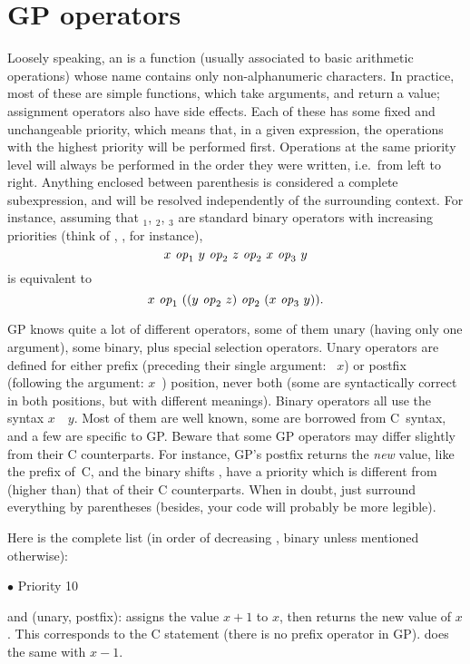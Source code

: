 \section{GP operators}\label{se:operators}

\noindent
Loosely speaking, an  is a function (usually associated to
basic arithmetic operations) whose name contains only non-alphanumeric
characters. In practice, most of these are simple functions, which take
arguments, and return a value; assignment operators also have side effects.
Each of these has some fixed and unchangeable priority, which means that,
in a given expression, the operations with the highest priority will be
performed first. Operations at the same priority level will always be
performed in the order they were written, i.e.~from left to right. Anything
enclosed between parenthesis is considered a complete subexpression, and
will be resolved independently of the surrounding context. For instance,
assuming that $_1$, $_2$, $_3$ are standard binary
operators with increasing priorities (think of \kbd{+}, \kbd{*}, \kbd{\pow}
for instance),
$$ x~\hbox{\it op\/}_1~y~\hbox{\it op\/}_2~z~\hbox{\it op\/}_2~x~\hbox{\it op\/}_3~y $$
is equivalent to
$$ x~\hbox{\it op\/}_1~((y~\hbox{\it op\/}_2~z)~\hbox{\it op\/}_2~ (x~\hbox{\it op\/}_3~y)).$$

GP knows quite a lot of different operators, some of them unary (having
only one argument), some binary, plus special selection operators. Unary
 operators are defined for either
prefix (preceding their single argument: ~$x$) or postfix (following
the argument: $x$~) position, never both
(some are syntactically correct in both positions, but with different
meanings). Binary operators all use the syntax $x$~~$y$. Most of
them are well known, some are borrowed from C~syntax, and a few are specific
to GP. Beware that some GP operators may differ slightly from their C
counterparts. For instance, GP's postfix \kbd{++} returns the \emph{new}
value, like the prefix \kbd{++} of~C, and the binary shifts \kbd{<<},
\kbd{>>} have a priority which is different from (higher than) that of
their C counterparts.
When in doubt, just surround everything by parentheses (besides, your code
will probably be more legible).

\noindent Here is the complete list (in order of decreasing ,
binary unless mentioned otherwise):

\def\point#1{\noindent $\bullet$ #1\hfill\break\indent\strut}
\point{Priority 10}
%
\kbd{++} and \kbd{--} (unary, postfix):  assigns the value $x+1$ to
$x$, then returns the new value of $x$. This corresponds to the C
statement  (there is no prefix \kbd{++} operator in GP).
 does the same with $x-1$.

